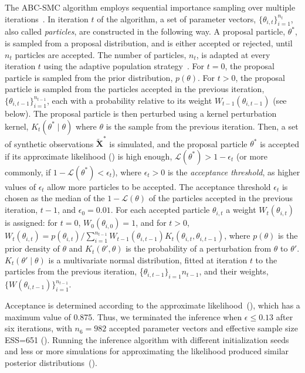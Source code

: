 \documentclass[12pt]{extarticle}
\let\vec\mathbf
\newcommand{\likelihood}{\mathcal{L}}
\begin{document}
The ABC-SMC algorithm employs sequential importance sampling over multiple iterations~\citep{Toni2009, Klinger2017, Syga2021}.
In iteration $t$ of the algorithm, a set of parameter vectors, $\{\theta_{i,t}\}_{i=1}^{n_t}$, also called \emph{particles}, are constructed in the following way.
A proposal particle, $\theta^*$, is sampled from a proposal distribution, and is either accepted or rejected, until $n_t$ particles are accepted.
The number of particles, $n_t$, is adapted at every iteration $t$ using the adaptive population strategy~\citep[\href{https://pyabc.readthedocs.io}{pyabc.readthedocs.io}]{Klinger2018}.
For $t=0$, the proposal particle is sampled from the prior distribution, $p(\theta)$.
For $t>0$, the proposal particle is sampled from the particles accepted in the previous iteration, $\{\theta_{i,t-1}\}_{i=1}^{n_{t-1}}$, each with a probability relative to its weight $W_{t-1}(\theta_{i,t-1})$ (see below). The proposal particle is then perturbed using a kernel perturbation kernel, $K_t(\theta^* \mid \theta)$ where $\theta$ is the sample from the previous iteration.
Then, a set of synthetic observations $\tilde{\vec X}^*$ is simulated, and the proposal particle $\theta^*$ is accepted if its approximate likelihood () is high enough, $\likelihood(\theta^*)>1-\epsilon_t$ (or more commonly, if $1-\likelihood(\theta^*) < \epsilon_t$), where $\epsilon_t>0$ is the \emph{acceptance threshold}, as higher values of $\epsilon_t$ allow more particles to be accepted. 
The acceptance threshold $\epsilon_t$ is chosen as the median of the $1-\likelihood(\theta)$ of the particles accepted in the previous iteration, $t-1$, and $\epsilon_0=0.01$. 
For each accepted particle $\theta_{i,t}$ a weight $W_t(\theta_{i,t})$ is assigned: for $t=0$, $W_0(\theta_{i,0})=1$, and for $t>0$, 
$W_t(\theta_{i,t}) = p(\theta_{i,t}) / \sum_{i=1}^{n_{t-1}}{W_{t-1}(\theta_{i,t-1}) K_t(\theta_{i,t}, \theta_{i,t-1})}$, where $p(\theta)$ is the prior density of $\theta$ and $K_t(\theta', \theta)$ is the probability of a perturbation from $\theta$ to $\theta'$.
$K_t(\theta' \mid \theta)$ is a multivariate normal distribution, fitted at iteration $t$ to the particles from the previous iteration, \{$\theta_{i,t-1}\}_{i=1}{n_{t-1}}$, and their weights, $\{W(\theta_{i,t-1})\}_{i=1}^{n_{t-1}}$.

Acceptance is determined according to the approximate likelihood~(), which has a maximum value of 0.875. Thus, we terminated the inference when $\epsilon \le 0.13$ after six iterations, with $n_6=982$ accepted parameter vectors and effective sample size ESS=651 (). Running the inference algorithm with different initialization seeds and less or more simulations for approximating the likelihood produced similar posterior distributions~().
\end{document}
